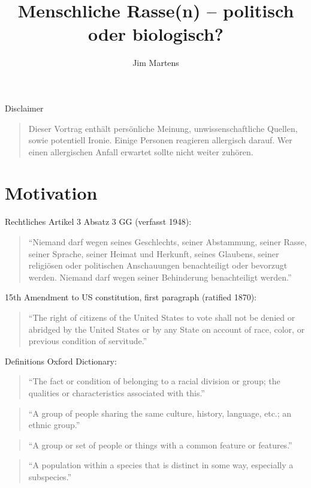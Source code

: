 \documentclass{beamer}
\begin{document}
\author{Jim Martens}
\title{Menschliche Rasse(n) -- politisch oder biologisch?}

	{
	\begin{frame}
		\titlepage
	\end{frame}
	}
	\addtocounter{framenumber}{-1}
	
	\begin{frame}{Disclaimer}
		\begin{quotation}
			Dieser Vortrag enthält persönliche Meinung, unwissenschaftliche Quellen, sowie potentiell Ironie. Einige Personen reagieren allergisch darauf. Wer einen allergischen Anfall erwartet sollte nicht weiter zuhören.
		\end{quotation}
	
	\end{frame}
	
	
	\section{Motivation}
	\begin{frame}{Rechtliches}
		Artikel 3 Absatz 3 GG (verfasst 1948):
		\begin{quotation}
		"`Niemand darf wegen seines Geschlechts, seiner Abstammung, seiner Rasse, seiner Sprache, seiner Heimat und Herkunft, seines Glaubens, seiner religiösen oder politischen Anschauungen benachteiligt oder bevorzugt werden. Niemand darf wegen seiner Behinderung benachteiligt werden."'
		\end{quotation}
		
		15th Amendment to US constitution, first paragraph (ratified 1870):
		\begin{quotation}
		``The right of citizens of the United States to vote shall not be denied or abridged by the United States or by any State on account of race, color, or previous condition of servitude.''
		\end{quotation}
	\end{frame}
	
	\begin{frame}{Definitions}
		Oxford Dictionary:
		\begin{quotation}
			``The fact or condition of belonging to a racial division or group; the qualities or characteristics associated with this.''
		\end{quotation}
		\begin{quotation}
			``A group of people sharing the same culture, history, language, etc.; an ethnic group.''
		\end{quotation}
		\begin{quotation}
			``A group or set of people or things with a common feature or features.''
		\end{quotation}
		\begin{quotation}
			``A population within a species that is distinct in some way, especially a subspecies.''
		\end{quotation}
	\end{frame}
	
\end{document}
